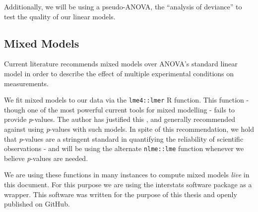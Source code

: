 	    Additionally, we will be using a pseudo-ANOVA, the “analysis of deviance” \cite{Hastie1992} to test the quality of our linear models. 
	\subsection{Mixed Models}\label{sec:m_sa_lm}
	    Current literature \cite{Baayen2008} recommends mixed models over ANOVA's standard linear model in order to describe the effect of multiple experimental conditions on measurements.
	    
	    We fit mixed models to our data via the \colorbox{vlg}{\texttt{lme4::lmer}} \cite{Bates2005,Bates2007} R function.
	    This function - though one of the most powerful current tools for mixed modelling - fails to provide \textit{p}-values.
	    The author has justified this \cite{Bates2006}, and generally recommended against using \textit{p}-values with such models.
	    In spite of this recommendation, we hold that \textit{p}-values are a stringent standard in quantifying the reliability of scientific observations -
	    and will be using the alternate \colorbox{vlg}{\texttt{nlme::lme}} \cite{Pinheiro2013} function whenever we believe \textit{p}-values are needed.
	    
	    We are using these functions in many instances to compute mixed models \textit{live} in this document.
	    For this purpose we are using the interstats \cite{interstats} software package as a wrapper.
	    This software was written for the purpose of this thesis and openly published on GitHub\cite{github}.

